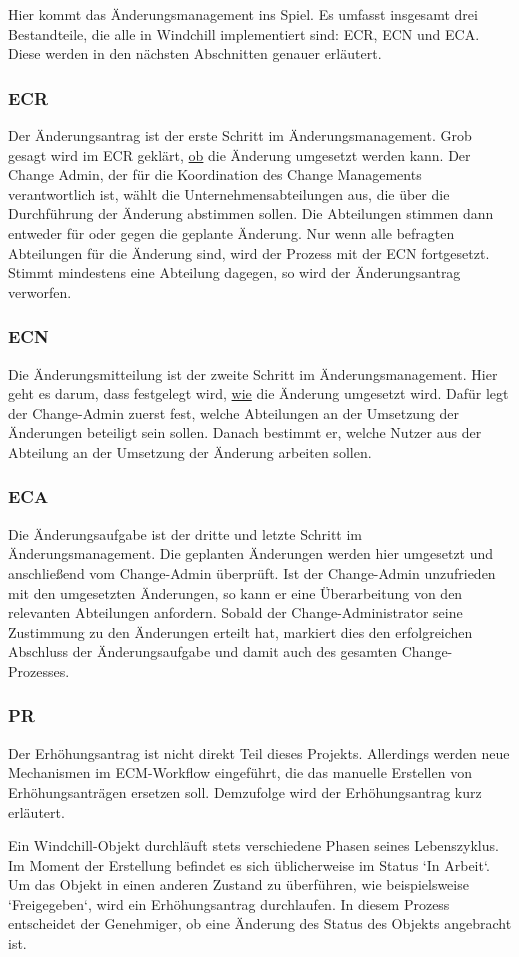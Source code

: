 Hier kommt das Änderungsmanagement ins Spiel.
Es umfasst insgesamt drei Bestandteile, die alle in Windchill implementiert sind: \acl{ECR}, \acl{ECN} und \acl{ECA}.
Diese werden in den nächsten Abschnitten genauer erläutert.

\subsubsection{\acl{ECR}}
Der Änderungsantrag ist der erste Schritt im Änderungsmanagement.
Grob gesagt wird im \ac{ECR} geklärt, \underline{ob} die Änderung umgesetzt werden kann.
Der Change Admin, der für die Koordination des Change Managements verantwortlich ist, wählt die Unternehmensabteilungen aus, die über die Durchführung der Änderung abstimmen sollen.
Die Abteilungen stimmen dann entweder für oder gegen die geplante Änderung.
Nur wenn alle befragten Abteilungen für die Änderung sind, wird der Prozess mit der \ac{ECN} fortgesetzt.
Stimmt mindestens eine Abteilung dagegen, so wird der Änderungsantrag verworfen.

\subsubsection{\acl{ECN}}
Die Änderungsmitteilung ist der zweite Schritt im Änderungsmanagement.
Hier geht es darum, dass festgelegt wird, \underline{wie} die Änderung umgesetzt wird.
Dafür legt der Change-Admin zuerst fest, welche Abteilungen an der Umsetzung der Änderungen beteiligt sein sollen.
Danach bestimmt er, welche Nutzer aus der Abteilung an der Umsetzung der Änderung arbeiten sollen.

\subsubsection{\acl{ECA}}
Die Änderungsaufgabe ist der dritte und letzte Schritt im Änderungsmanagement.
Die geplanten Änderungen werden hier umgesetzt und anschließend vom Change-Admin überprüft.
Ist der Change-Admin unzufrieden mit den umgesetzten Änderungen, so kann er eine Überarbeitung von den relevanten Abteilungen anfordern.
Sobald der Change-Administrator seine Zustimmung zu den Änderungen erteilt hat, markiert dies den erfolgreichen Abschluss der Änderungsaufgabe und damit auch des gesamten Change-Prozesses.

\subsubsection{\acl{PR}}
Der Erhöhungsantrag ist nicht direkt Teil dieses Projekts.
Allerdings werden neue Mechanismen im \ac{ECM}-Workflow eingeführt, die das manuelle Erstellen von Erhöhungsanträgen ersetzen soll.
Demzufolge wird der Erhöhungsantrag kurz erläutert.

Ein Windchill-Objekt durchläuft stets verschiedene Phasen seines Lebenszyklus.
Im Moment der Erstellung befindet es sich üblicherweise im Status `In Arbeit`.
Um das Objekt in einen anderen Zustand zu überführen, wie beispielsweise `Freigegeben`, wird ein Erhöhungsantrag durchlaufen.
In diesem Prozess entscheidet der Genehmiger, ob eine Änderung des Status des Objekts angebracht ist.